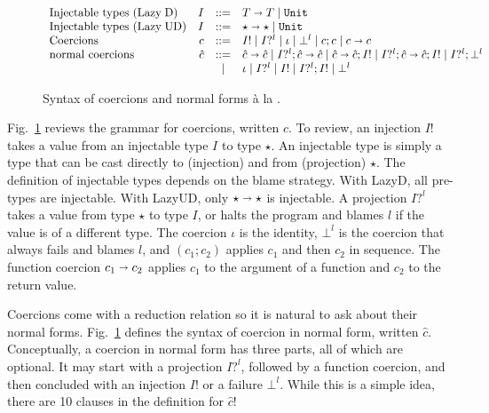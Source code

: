 \documentclass[acmsmall,review,anonymous]{acmart}\settopmatter{printfolios=true,printccs=false,printacmref=false}
\newcommand{\figref}[1]{Fig.~\ref{#1}}
\newcommand{\stxrule}[3]{\text{#2} & #1 & ::= & #3\\}
\newcommand{\stxrulecont}[1]{& & | & #1 \\}
\newcommand{\lazyUD}{Lazy\;UD}
\newcommand{\lazyD}{Lazy\;D}
\newcommand{\TOOdyn}[0]{\star}
\newcommand{\POOunit}[0]{\mathtt{Unit}}
\newcommand{\POOfun}[2]{#1 \shortrightarrow #2}
\newcommand{\vOOcast}[2]{#1\langle#2\rangle}
\newcommand{\ncProj}[2]{#1?^{#2}}
\newcommand{\ncInj}[1]{#1!}
\newcommand{\ncId}[0]{\iota}
\newcommand{\ncSeq}[2]{#1;#2}
\newcommand{\ncFail}[1]{\bot^{#1}}
\newcommand{\ncFun}[2]{\POOfun{#1}{#2}}
\begin{document}
\begin{figure}
  \[
  \begin{array}{lrcl}
  \stxrule{I}{Injectable types (\lazyD)}{
    \POOfun{T}{T} \mid \POOunit}
  \stxrule{I}{Injectable types (\lazyUD)}{
    \POOfun{\TOOdyn}{\TOOdyn} \mid \POOunit
  }
  \stxrule{c}{Coercions}{
    \ncInj{I} \mid
    \ncProj{I}{l} \mid
    \ncId \mid
    \ncFail{l} \mid
    \ncSeq{c}{c} \mid
    \ncFun{c}{c}
  }
\stxrule{\hat{c}}{normal coercions}{
  \ncFun{\hat{c}}{\hat{c}} \mid
  \ncSeq{\ncProj{I}{l}}{\ncFun{\hat{c}}{\hat{c}}} \mid
  \ncSeq{\ncFun{\hat{c}}{\hat{c}}}{\ncInj{I}} \mid
  \ncSeq{\ncProj{I}{l}}{\ncSeq{\ncFun{\hat{c}}{\hat{c}}}{\ncInj{I}}} \mid
  \ncSeq{\ncProj{I}{l}}{\ncFail{l}}
}
\stxrulecont{
  \ncId \mid
  \ncProj{I}{l} \mid
  \ncInj{I} \mid
  \ncSeq{\ncProj{I}{l}}{\ncInj{I}} \mid
  \ncFail{l} 
}
  \end{array}
  \]
  \caption{Syntax of coercions and normal forms {\`a} la \citet{siek2012interpretations}.}
  \label{fig:normal-coercion}
\end{figure}

\figref{fig:normal-coercion} reviews the grammar for coercions,
written $c$.
%
To review, an injection $I!$ takes a value from an injectable type
$I$ to type $\TOOdyn$. An injectable type is simply a type that can be
cast directly to (injection) and from (projection) $\TOOdyn$. The
definition of injectable types depends on the blame strategy. With \lazyD,
all pre-types are injectable. With \lazyUD, only
$\POOfun{\TOOdyn}{\TOOdyn}$ is injectable.
%
A projection $I?^l$ takes a value from type $\TOOdyn$ to type $I$, or
halts the program and blames $l$ if the value is of a different type.
The coercion $\iota$ is the identity, $\bot^{l}$ is the coercion that
always fails and blames $l$, and $(\ncSeq{c_1}{c_2})$ applies $c_1$ and
then $c_2$ in sequence. The function coercion $\ncFun{c_1}{c_2}$
applies $c_1$ to the argument of a function and $c_2$ to the return
value.

Coercions come with a reduction relation so it is natural to ask about
their normal forms. \figref{fig:normal-coercion} defines the syntax of
coercion in normal form, written $\hat{c}$. Conceptually, a coercion
in normal form has three parts, all of which are optional.  It may
start with a projection $I?^l$, followed by a function coercion, and
then concluded with an injection $I!$ or a failure $\bot^l$. While
this is a simple idea, there are 10 clauses in the definition for
$\hat{c}$!

\end{document}
